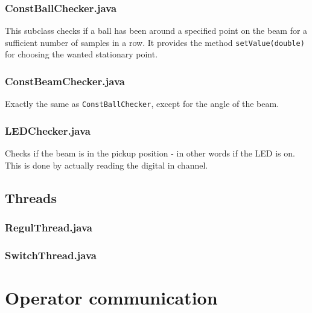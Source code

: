 \documentclass{article}
\begin{document}

\subsubsection{ConstBallChecker.java}

This subclass checks if a ball has been around a specified point on the beam for a sufficient number of samples in a row. It provides the method \texttt{setValue(double)} for choosing the wanted stationary point.

\subsubsection{ConstBeamChecker.java}

Exactly the same as \texttt{ConstBallChecker}, except for the angle of the beam.

\subsubsection{LEDChecker.java}

Checks if the beam is in the pickup position - in other words if the LED is on. This is done by actually reading the digital in channel.

\subsection{Threads}

\subsubsection{RegulThread.java}

\subsubsection{SwitchThread.java}

\section{Operator communication}\label{OpCom}
\end{document}
